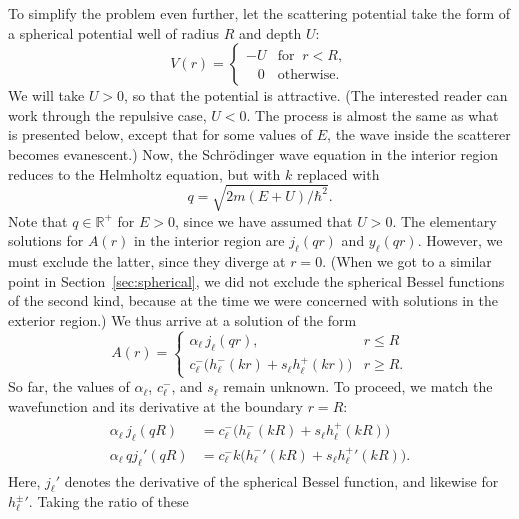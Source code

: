 \documentclass[pra,12pt]{revtex4}
\begin{document}
To simplify the problem even further, let the scattering potential
take the form of a spherical potential well of radius $R$ and depth
$U$:
\begin{equation}
  V(r) = \begin{cases}-U &\mathrm{for}\;\; r < R, \\ \;\;\; 0 & \mathrm{otherwise}.\end{cases}
\end{equation}
We will take $U > 0$, so that the potential is attractive.  (The
interested reader can work through the repulsive case, $U < 0$.  The
process is almost the same as what is presented below, except that for
some values of $E$, the wave inside the scatterer becomes evanescent.)
Now, the Schr\"odinger wave equation in the interior region reduces to
the Helmholtz equation, but with $k$ replaced with
\begin{equation}
  q = \sqrt{2m(E+U)/\hbar^2}.
\end{equation}
Note that $q \in \mathbb{R}^+$ for $E > 0$, since we have assumed
that $U > 0$.  The elementary solutions for $A(r)$ in the interior
region are $j_\ell(qr)$ and $y_\ell(qr)$.  However, we must exclude
the latter, since they diverge at $r = 0$.  (When we got to a similar
point in Section~\ref{sec:spherical}, we did not exclude the spherical
Bessel functions of the second kind, because at the time we were
concerned with solutions in the exterior region.)  We thus arrive at a
solution of the form
\begin{equation}
  A(r) = \begin{cases} \alpha_\ell\, j_\ell(qr), & r \le R \\ c^-_\ell \Big(h^-_\ell(kr) + s_\ell h^+_\ell(kr)\Big) & r \ge R.\end{cases}
\end{equation}
So far, the values of $\alpha_\ell$, $c^-_\ell$, and $s_\ell$ remain
unknown.  To proceed, we match the wavefunction and its
derivative at the boundary $r = R$:
\begin{align}
  \begin{aligned} \alpha_\ell\, j_\ell(qR) &= c^-_\ell \Big(h^-_\ell(kR) + s_\ell h^+_\ell(kR)\Big) \\ \alpha_\ell\, q j_\ell'(qR) &= c^-_\ell k \Big({h^-_\ell}'(kR) + s_\ell {h^+_\ell}'(kR)\Big).\end{aligned}
\end{align}
Here, $j_\ell'$ denotes the derivative of the spherical Bessel
function, and likewise for ${h_\ell^\pm}'$.  Taking the ratio of these
\end{document}
